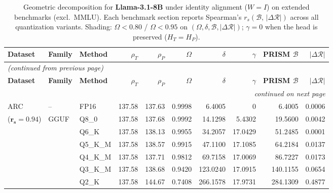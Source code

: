 \begingroup
\small
\setlength{\tabcolsep}{4pt}
\renewcommand{\arraystretch}{1.05}
\setlength{\LTcapwidth}{\textwidth}
\begin{longtable}{ll l rrrrrrr}
\caption{Geometric decomposition for \textbf{Llama-3.1-8B} under identity alignment ($W{=}I$) on extended benchmarks (excl.\ MMLU). Each benchmark section reports Spearman's $r_s(\mathcal{B},\,|\Delta\mathcal{R}|)$ across all quantization variants. Shading: \colorbox{red!35}{$\Omega{<}0.80$} / \colorbox{red!18}{$\Omega{<}0.95$} on $(\Omega,\delta,\mathcal{B},|\Delta\mathcal{R}|)$; \colorbox{cyan!12}{$\gamma{=}0$} when the head is preserved ($H_T{=}H_P$).}\label{tab:llama_decomposition_ext_bound}\\
\toprule
\textbf{Dataset} & \textbf{Family} & \textbf{Method} & \textbf{$\rho_T$} & \textbf{$\rho_P$} & \textbf{$\Omega$} & \textbf{$\delta$} & \textbf{$\gamma$} & \textbf{PRISM $\mathcal{B}$} & \textbf{$|\Delta\mathcal{R}|$} \\
\midrule
\endfirsthead
\multicolumn{10}{l}{\small\itshape (continued from previous page)}\\
\toprule
\textbf{Dataset} & \textbf{Family} & \textbf{Method} & \textbf{$\rho_T$} & \textbf{$\rho_P$} & \textbf{$\Omega$} & \textbf{$\delta$} & \textbf{$\gamma$} & \textbf{PRISM $\mathcal{B}$} & \textbf{$|\Delta\mathcal{R}|$} \\
\midrule
\endhead
\midrule
\multicolumn{10}{r}{\small\itshape continued on next page}\\
\endfoot
\bottomrule
\endlastfoot
ARC & -- & FP16 & 137.58 & 137.63 & 0.9998 & 6.4005 & \cellcolor{cyan!12} $0$ & 6.4005 & 0.0006 \\
{\small ($\mathbf{r_s{=}0.94}$)} & GGUF & Q8\_0 & 137.58 & 137.68 & 0.9992 & 14.1298 & 5.4302 & 19.5600 & 0.0042 \\
 &  & Q6\_K & 137.58 & 138.13 & 0.9955 & 34.2057 & 17.0429 & 51.2485 & 0.0001 \\
 &  & Q5\_K\_M & 137.58 & 138.57 & 0.9915 & 47.1100 & 17.1085 & 64.2184 & 0.0137 \\
 &  & Q4\_K\_M & 137.58 & 137.71 & 0.9812 & 69.7158 & 17.0069 & 86.7227 & 0.0173 \\
 &  & Q3\_K\_M & 137.58 & 138.68 & \cellcolor{red!18} 0.9420 & \cellcolor{red!18} 123.0240 & 17.0915 & \cellcolor{red!18} 140.1155 & \cellcolor{red!18} 0.0654 \\
 &  & Q2\_K & 137.58 & 144.67 & \cellcolor{red!35} 0.7408 & \cellcolor{red!35} 266.1578 & 17.9731 & \cellcolor{red!35} 284.1309 & \cellcolor{red!35} 0.4877 \\

\end{longtable}
